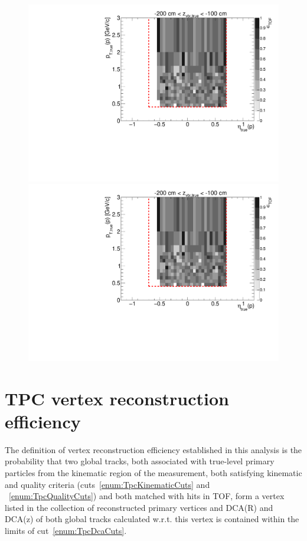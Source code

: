 \begin{figure}[hb]
{  \includegraphics[width=\linewidth,page=16]{graphics/eff/Eff2D_TOF_proton_Plus.pdf}\\
  \includegraphics[width=\linewidth,page=18]{graphics/eff/Eff2D_TOF_proton_Plus.pdf}
}%
\end{figure}

\section{TPC vertex reconstruction efficiency}\label{sec:tpcVxRecoEff}

The definition of vertex reconstruction efficiency established in this analysis is the probability that two global tracks, both associated with true-level primary particles from the kinematic region of the measurement, both satisfying kinematic and quality criteria (cuts~\ref{enum:TpcKinematicCuts} and ~\ref{enum:TpcQualityCuts}) and both matched with hits in TOF, form a vertex listed in the collection of reconstructed primary vertices and DCA(R) and DCA(z) of both global tracks calculated w.r.t. this vertex is contained within the limits of cut~\ref{enum:TpcDcaCuts}.